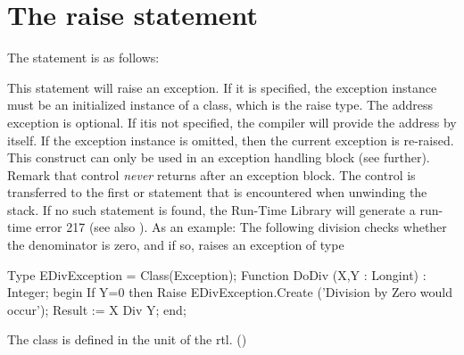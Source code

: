\documentclass{report}
\begin{document}
\section{The raise statement}
The  statement is as follows:

This statement will raise an exception. If it is specified, the exception 
instance must be an initialized instance of a class, which is the raise 
type. The address exception is optional. If itis not specified, the compiler
will provide the address by itself.
If the exception instance is omitted, then the current exception is
re-raised. This construct can only be used in an exception handling
block (see further).
Remark that control {\em never} returns after an exception block. The
control is transferred to the first  or 
 statement that is encountered when unwinding the stack.
If no such statement is found, the \fpc Run-Time Library will generate a
run-time error 217 (see also ).
As an example: The following division checks whether the denominator is
zero, and if so, raises an exception of type 
\begin{listing}
Type EDivException = Class(Exception);
Function DoDiv (X,Y : Longint) : Integer;
begin
  If Y=0 then 
    Raise EDivException.Create ('Division by Zero would occur');
  Result := X Div Y;
end;
\end{listing}
The class  is defined in the  unit of the rtl.
()
\end{document}

